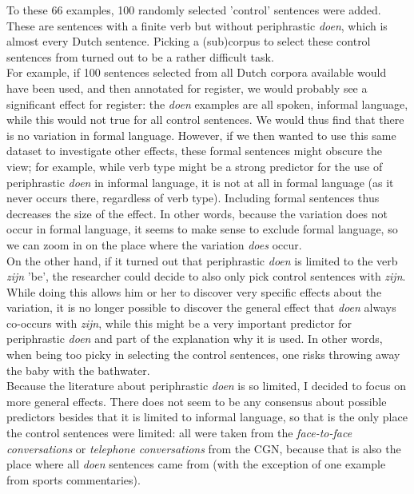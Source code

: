 \documentclass[12pt]{article}
\begin{document}
To these 66 examples, 100 randomly selected 'control' sentences were added. These are sentences with a finite verb but without periphrastic \emph{doen}, which is almost every Dutch sentence. Picking a (sub)corpus to select these control sentences from turned out to be a rather difficult task. \\\indent
For example, if 100 sentences selected from all Dutch corpora available would have been used, and then annotated for register, we would probably see a significant effect for register: the \emph{doen} examples are all spoken, informal language, while this would not true for all control sentences. We would thus find that there is no variation in formal language. However, if we then wanted to use this same dataset to investigate other effects, these formal sentences might obscure the view; for example, while verb type might be a strong predictor for the use of periphrastic \emph{doen} in informal language, it is not at all in formal language (as it never occurs there, regardless of verb type). Including formal sentences thus decreases the size of the effect. In other words, because the variation does not occur in formal language, it seems to make sense to exclude formal language, so we can zoom in on the place where the variation \emph{does} occur. \\\indent 
On the other hand, if it turned out that periphrastic \emph{doen} is limited to the verb \emph{zijn} 'be', the researcher could decide to also only pick control sentences with \emph{zijn}. While doing this allows him or her to discover very specific effects about the variation, it is no longer possible to discover the general effect that \emph{doen} always co-occurs with \emph{zijn}, while this might be a very important predictor for periphrastic \emph{doen} and part of the explanation why it is used. In other words, when being too picky in selecting the control sentences, one risks throwing away the baby with the bathwater.\\\indent
Because the literature about periphrastic \emph{doen} is so limited, I decided to focus on more general effects. There does not seem to be any consensus about possible predictors besides that it is limited to informal language, so that is the only place the control sentences were limited: all were taken from the \emph{face-to-face conversations} or \emph{telephone conversations} from the CGN, because that is also the place where all \emph{doen} sentences came from (with the exception of one example from sports commentaries).
\end{document}
